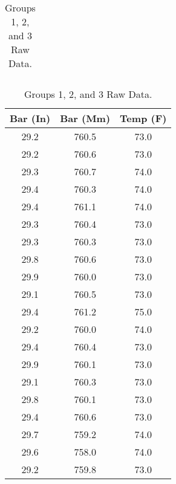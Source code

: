 \documentclass[conf]{new-aiaa}
\begin{document}
\begin{table}[ht]
\begin{minipage}{0.32\textwidth}
\begin{tabular}{||c c c||}
             \hline
        \end{tabular}
    \end{minipage}
    \hfill
    \begin{minipage}{0.32\textwidth}
        \centering
        \begin{tabular}{||c c c||}
            \hline
            Bar (In) & Bar (Mm) & Temp (F)  \\ [0.5ex]
            \hline\hline
             29.2 & 760.5 & 73.0 \\
             \hline
             29.2 & 760.6 & 73.0 \\
             \hline
             29.3 & 760.7 & 74.0 \\
             \hline
             29.4 & 760.3 & 74.0 \\
             \hline
             29.4 & 761.1 & 74.0 \\
             \hline
             29.3 & 760.4 & 73.0 \\
             \hline
             29.3 & 760.3 & 73.0 \\
             \hline
             29.8 & 760.6 & 73.0 \\
             \hline
             29.9 & 760.0 & 73.0 \\
             \hline
             29.1 & 760.5 & 73.0 \\
             \hline
             29.4 & 761.2 & 75.0 \\
             \hline
             29.2 & 760.0 & 74.0 \\
             \hline
             29.4 & 760.4 & 73.0 \\
             \hline
             29.9 & 760.1 & 73.0 \\
             \hline
             29.1 & 760.3 & 73.0 \\
             \hline
             29.8 & 760.1 & 73.0 \\
             \hline
             29.4 & 760.6 & 73.0 \\
             \hline
             29.7 & 759.2 & 74.0 \\
             \hline
             29.6 & 758.0 & 74.0 \\
             \hline
             29.2 & 759.8 & 73.0 \\
             \hline
        \end{tabular}
    \end{minipage}
    \caption{Groups 1, 2, and 3 Raw Data.}
\end{table}
\end{document}
